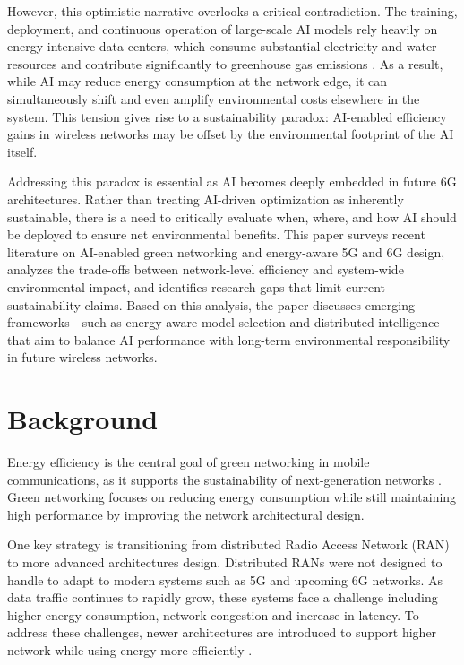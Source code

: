 \documentclass[letterpaper]{article} %
\begin{document}
However, this optimistic narrative overlooks a critical contradiction. The training, deployment, and continuous operation of large-scale AI models rely heavily on energy-intensive data centers, which consume substantial electricity and water resources and contribute significantly to greenhouse gas emissions \cite{strubell_energy_2019, kamran_energy-aware_2025}. As a result, while AI may reduce energy consumption at the network edge, it can simultaneously shift and even amplify environmental costs elsewhere in the system. This tension gives rise to a sustainability paradox: AI-enabled efficiency gains in wireless networks may be offset by the environmental footprint of the AI itself.

Addressing this paradox is essential as AI becomes deeply embedded in future 6G architectures. Rather than treating AI-driven optimization as inherently sustainable, there is a need to critically evaluate when, where, and how AI should be deployed to ensure net environmental benefits. This paper surveys recent literature on AI-enabled green networking and energy-aware 5G and 6G design, analyzes the trade-offs between network-level efficiency and system-wide environmental impact, and identifies research gaps that limit current sustainability claims. Based on this analysis, the paper discusses emerging frameworks—such as energy-aware model selection and distributed intelligence—that aim to balance AI performance with long-term environmental responsibility in future wireless networks.


\section{Background}
Energy efficiency is the central goal of green networking in mobile communications, as it supports the sustainability of next-generation networks \cite{masoudi_data_nodate}. Green networking focuses on reducing energy consumption while still maintaining high performance by improving the network architectural design.

One key strategy is transitioning from distributed Radio Access Network (RAN) to more advanced architectures design. Distributed RANs were not designed to handle to adapt to modern systems such as 5G and upcoming 6G networks. As data traffic continues to rapidly grow, these systems face a challenge including higher energy consumption, network congestion and increase in latency. To address these challenges, newer architectures are introduced to support higher network while using energy more efficiently \cite{masoudi_data_nodate}.
\end{document}

